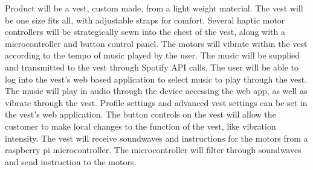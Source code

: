 Product will be a vest, custom made, from a light weight material. The vest will be one size fits all, with adjustable straps for comfort. Several haptic motor controllers will be strategically sewn into the chest of the vest, along with a microcontroller and button control panel. The motors will vibrate within the vest according to the tempo of music played by the user. The music will be supplied and transmitted to the vest through Spotify API calls. The user will be able to log into the vest’s web based application to select music to play through the vest. The music will play in audio through the device accessing the web app, as well as vibrate through the vest. Profile settings and advanced vest settings can be set in the vest’s web application. The button controls on the vest will allow the customer to make local changes to the function of the vest, like vibration intensity. The vest will receive soundwaves and instructions for the motors from a raspberry pi microcontroller. The microcontroller will filter through soundwaves and send instruction to the motors.
